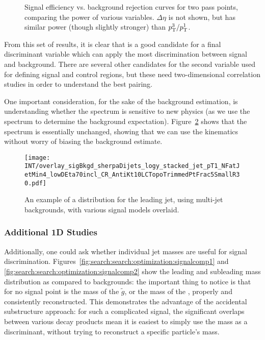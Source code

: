 
\begin{figure}
\centering
{}
\label{fig:search:search:optimization:All}
\caption{Signal efficiency vs. background rejection curves for two pass points, comparing the power of various variables. $\Delta \eta$ is not shown, but has similar power (though slightly stronger) than $p_{\text{T}}^3 / p_{\text{T}}^1$.}
\end{figure}


From this set of results, it is clear that \MJ is a good candidate for a final discriminant variable which can apply the most discrimination between signal and background. There are several other candidates for the second variable used for defining signal and control regions, but these need two-dimensional correlation studies in order to understand the best pairing.

One important consideration, for the sake of the background estimation, is understanding whether the \pt spectrum is sensitive to new physics (as we use the \pt spectrum to determine the background expectation). Figure~\ref{fig:search:search:optimization:pt} shows that the \pt spectrum is essentially unchanged, showing that we can use the kinematics without worry of biasing the background estimate.


\begin{figure}
\centering
\texttt{[image: INT/overlay\_sigBkgd\_sherpaDijets\_logy\_stacked\_jet\_pT1\_NFatJetMin4\_lowDEta70incl\_CR\_AntiKt10LCTopoTrimmedPtFrac5SmallR30.pdf]}
\label{fig:search:search:optimization:pt}
\caption{An example of a \pt distribution for the leading jet, using \Sherpa multi-jet backgrounds, with various signal models overlaid.}
\end{figure}

\subsubsection{Additional 1D Studies}

Additionally, one could ask whether individual jet masses are useful for signal discrimination. Figures~\ref{fig:search:search:optimization:signalcomp1} and \ref{fig:search:search:optimization:signalcomp2} show the leading and subleading mass distribution as compared to \Herwigpp backgrounds: the important thing to notice is that for no signal point is the mass of the $\tilde{g}$, or the mass of the \lsp, properly and consistently reconstructed. This demonstrates the advantage of the accidental substructure approach: for such a complicated signal, the significant overlaps between various decay products mean it is easiest to simply use the mass as a discriminant, without trying to reconstruct a specific particle's mass.


